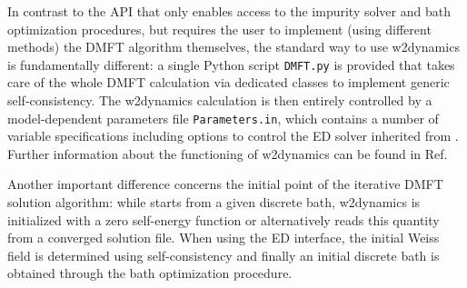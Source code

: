 \documentclass[edipack_sp.tex]{subfiles}
\begin{document}
In contrast to the \NAME API that only enables access to the impurity solver and bath optimization procedures, but requires the user to implement (using different methods) the DMFT algorithm themselves, the standard way to use w2dynamics is fundamentally different: a single Python script {\tt DMFT.py} is provided that takes care of the whole DMFT calculation via dedicated classes to implement generic self-consistency. The w2dynamics calculation is then entirely controlled by a model-dependent parameters file {\tt Parameters.in}, which contains a number of variable specifications including options to control the ED solver inherited from \NAME. Further information about the functioning of w2dynamics can be found in Ref.~           

Another important difference concerns the initial point of the iterative DMFT solution algorithm: while \NAME starts from a given discrete bath, w2dynamics is initialized with a zero self-energy function or alternatively reads this quantity from a converged solution file. When using the \NAME ED interface, the initial Weiss field is determined using self-consistency and finally an initial discrete bath is obtained through the \NAME bath optimization procedure. 
\end{document}
